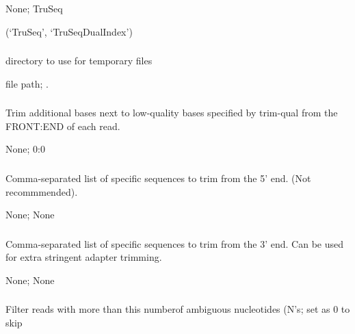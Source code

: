 \documentclass[letterpaper,11pt,english]{sphinxmanual}
\begin{document}
 None;  TruSeq

 (‘TruSeq’, ‘TruSeqDualIndex’)


\subsubsection{}
\label{\detokenize{prog_desc:temp-dir}}
 directory to use for temporary files

 file path;  .


\subsubsection{}
\label{\detokenize{prog_desc:trim-qual-pad}}
 Trim additional bases next to low-quality bases specified by \textendash{}trim-qual from the FRONT:END of each read.

 None;  0:0


\subsubsection{}
\label{\detokenize{prog_desc:y-trim-pattern-5}}
 Comma-separated list of specific sequences to trim from the 5’ end. (Not recommmended).

 None;  None


\subsubsection{}
\label{\detokenize{prog_desc:z-trim-pattern-3}}
 Comma-separated list of specific sequences to trim from the 3’ end. Can be used for extra stringent adapter trimming.

 None;  None


\subsubsection{}
\label{\detokenize{prog_desc:a-filter-ambig}}
 Filter reads with more than this numberof ambiguous nucleotides (N’s; set as 0 to skip
\end{document}
